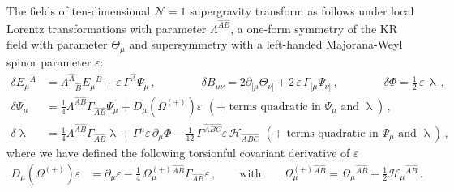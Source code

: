 \documentclass[a4paper,10pt,openany]{article}
\newcommand{\lr}{\left(}
\newcommand{\rr}{\right)}
\begin{document}
	The fields of ten-dimensional $\mathcal{N}=1$ supergravity transform as follows under local Lorentz transformations with parameter $\Lambda^{\hat{A}\hat{B}}$, a one-form symmetry of the KR field with parameter $\Theta_\mu$ and supersymmetry with a left-handed Majorana-Weyl spinor parameter $\varepsilon$:
	\begin{subequations}\label{eq:trafosrel}
		\begin{align}
			\delta E_\mu{}^{\hat{A}} &= \Lambda^{\hat{A}}{}_{\hat{B}} E_\mu{}^{\hat{B}} + \bar{\varepsilon}\,\Gamma^{\hat{A}}\Psi_\mu\,, \qquad \qquad
			\delta B_{\mu\nu} = 2 \partial_{[\mu} \Theta_{\nu]} + 2\,\bar{\varepsilon}\,\Gamma_{[\mu}\Psi_{\nu]}\,,  \qquad \qquad
			\delta \Phi = \frac{1}{2}\,\bar{\varepsilon}\,\uplambda\,, \label{eq:trafosVielBDil} \\
			\delta \Psi_\mu &= \frac{1}{4} \Lambda^{\hat{A}\hat{B}} \Gamma_{\hat{A}\hat{B}} \Psi_\mu + D_\mu(\Omega^{(+)}) \varepsilon \ \, (+ \text{ terms quadratic in } \Psi_\mu \text{ and } \uplambda) \,, \label{eq:trafosGravo} \\ %
			\delta \uplambda &= \frac{1}{4} \Lambda^{\hat{A}\hat{B}} \Gamma_{\hat{A}\hat{B}} \uplambda + \Gamma^\mu\varepsilon\,\mathcal \partial_\mu \Phi - \frac{1}{12}\,\Gamma^{\hat{A}\hat{B}\hat{C}}\varepsilon\, \mathcal{H}_{\hat{A}\hat{B}\hat{C}}\ \, (+ \text{ terms quadratic in } \Psi_\mu \text{ and } \uplambda) \,, \label{eq:trafosDilo} %
		\end{align}
	\end{subequations}
	where we have defined the following torsionful covariant derivative of $\varepsilon$
	\begin{align} \label{eq:DOmegapm}
		D_\mu(\Omega^{(+)})\varepsilon &= \partial_\mu\varepsilon - \frac14\,\Omega^{(+)}_\mu{}^{\hat A\hat B}\Gamma_{\hat A\hat B}\varepsilon\,, \qquad \text{with} \qquad \Omega^{(+)}_\mu{}^{\hat A\hat B} = \Omega_\mu{}^{\hat A\hat B} + \frac12 \mathcal{H}_\mu{}^{\hat A\hat B} \,.
	\end{align}
	
\end{document}
